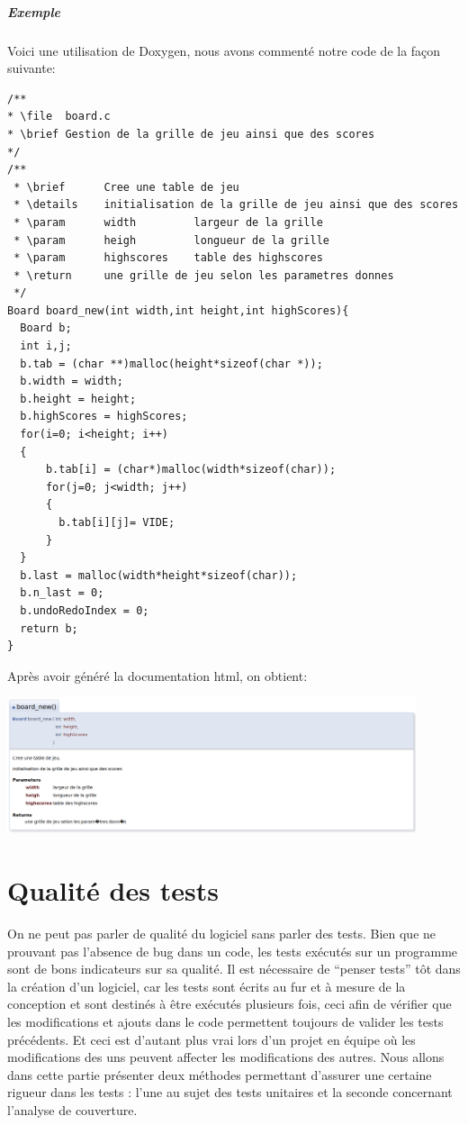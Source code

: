 \documentclass{report}
\begin{document}
\paragraph{Exemple}
Voici une utilisation de Doxygen, nous avons commenté notre code de la façon suivante:
\begin{scriptsize}
\begin{lstlisting}
/**
* \file  board.c
* \brief Gestion de la grille de jeu ainsi que des scores 
*/
/**
 * \brief      Cree une table de jeu
 * \details    initialisation de la grille de jeu ainsi que des scores
 * \param      width         largeur de la grille
 * \param      heigh         longueur de la grille
 * \param      highscores    table des highscores
 * \return     une grille de jeu selon les parametres donnes
 */
Board board_new(int width,int height,int highScores){
  Board b;
  int i,j;
  b.tab = (char **)malloc(height*sizeof(char *));
  b.width = width;
  b.height = height;
  b.highScores = highScores;
  for(i=0; i<height; i++)
  {
      b.tab[i] = (char*)malloc(width*sizeof(char));
      for(j=0; j<width; j++)
      {
        b.tab[i][j]= VIDE;
      }
  }
  b.last = malloc(width*height*sizeof(char));
  b.n_last = 0;
  b.undoRedoIndex = 0;
  return b;
}
\end{lstlisting}
\end{scriptsize}
Après avoir généré la documentation html, on obtient:
\begin{center}
\includegraphics[width=12cm]{board.png}
\end{center}

\chapter{Qualité des tests}
On ne peut pas parler de qualité du logiciel sans parler des tests. Bien que ne prouvant pas l'absence de bug dans un code, les tests exécutés sur un programme sont de bons indicateurs sur sa qualité. Il est nécessaire de ``penser tests'' tôt dans la création d'un logiciel, car les tests sont écrits au fur et à mesure de la conception et sont destinés à être exécutés plusieurs fois, ceci afin de vérifier que les modifications et ajouts dans le code permettent toujours de valider les tests précédents. Et ceci est d'autant plus vrai lors d'un projet en équipe où les modifications des uns peuvent affecter les modifications des autres. Nous allons dans cette partie présenter deux méthodes permettant d'assurer une certaine rigueur dans les tests : l'une au sujet des tests unitaires et la seconde concernant l'analyse de couverture.
\end{document}
